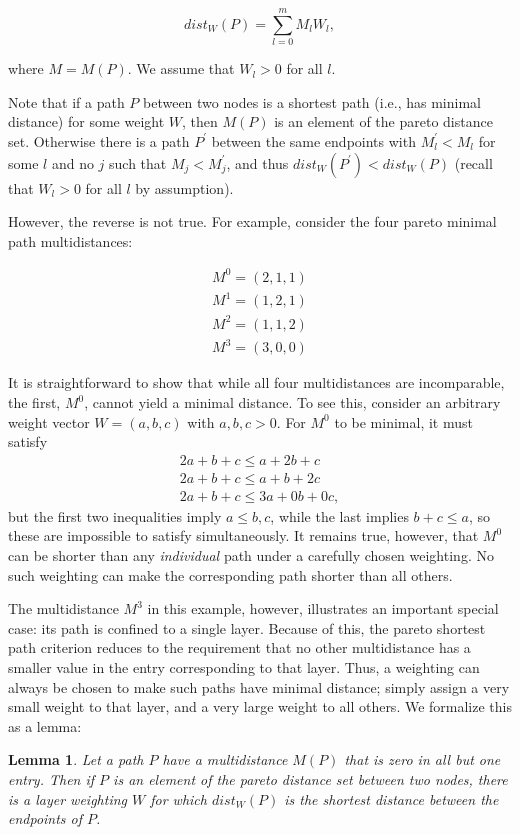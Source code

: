 \documentclass{article}
\newtheorem{lemma}[theorem]{Lemma}
\begin{document}
\[
    dist_W(P)=\sum_{l=0}^{m} M_l W_l,
\]

where $M=M(P)$. We assume that $W_l>0$ for all $l$.

Note that if a path $P$ between two nodes is a shortest path (i.e., has minimal distance) for some
weight $W$, then $M(P)$
is an element of the pareto distance set. Otherwise there is a path $P^\prime$ between the same
endpoints with $M_l^\prime<M_l$ for some $l$ and no $j$ such that $M_j<M_j^\prime$, and thus
$dist_W(P^\prime)<dist_W(P)$  (recall that $W_l>0$ for all $l$ by assumption).

However, the reverse is not true. For example, consider the four pareto minimal path multidistances:

\begin{align*}
    M^0=(2,1,1) \\
    M^1=(1,2,1) \\
    M^2=(1,1,2) \\
    M^3=(3,0,0)
\end{align*}


It is straightforward to show that while all four multidistances are incomparable, the first, $M^0$,
cannot yield a minimal distance. To see this, consider an arbitrary weight vector $W=(a,b,c)$ with
$a,b,c>0$. For $M^0$ to be minimal, it must satisfy
\begin{align*}
    2a+b+c \leq a+2b+c \\
    2a+b+c \leq a+b+2c \\
    2a+b+c \leq 3a+0b+0c,
\end{align*}
but the first two inequalities imply $a\leq b,c$, while the last implies $b+c\leq a$, so these are
impossible to satisfy simultaneously. It remains true, however, that $M^0$ can be shorter than any
\emph{individual} path under a carefully chosen weighting. No such weighting can make the corresponding
path shorter than all others.

The multidistance $M^3$ in this example, however, illustrates an important special case: its path
is confined to a single layer. Because of this, the pareto shortest path criterion reduces to the
requirement that no other multidistance has a smaller value in the entry corresponding to that layer.
Thus, a weighting can always be chosen to make such paths have minimal distance; simply assign a very
small weight to that layer, and a very large weight to all others. We formalize this as a lemma:

\begin{lemma}
    Let a path $P$ have a multidistance $M(P)$ that is zero in all but one entry. Then if $P$ is an
    element of the pareto distance set between two nodes, there is a layer weighting $W$ for which
    $dist_W(P)$ is the shortest distance between the endpoints of $P$.
\end{lemma}
\end{document}
